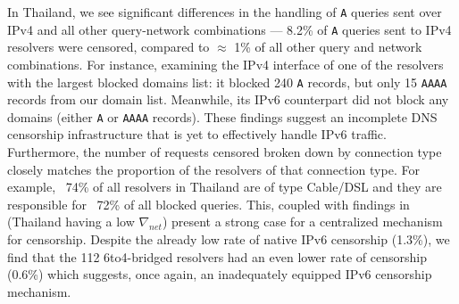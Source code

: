 In Thailand, we see significant differences in the handling of {\tt A} queries
sent over IPv4 and all other query-network combinations --- 8.2\% of \texttt{A}
queries sent to IPv4 resolvers were censored, compared to $\approx$ 1\% of all
other query and network combinations. 
For instance, examining the IPv4 interface of one of the resolvers with the
largest blocked domains list: it blocked 240 \texttt{A} records, but only 15
\texttt{AAAA} records from our domain list. Meanwhile, its IPv6 counterpart did
not block any domains (either \texttt{A} or \texttt{AAAA} records). These
findings suggest an incomplete DNS censorship infrastructure that is yet to
effectively handle IPv6 traffic.
%
Furthermore, the number of requests censored broken down by connection type
closely matches the proportion of the resolvers of that connection type. For
example, ~74\% of all resolvers in Thailand are of type Cable/DSL and they are
responsible for ~72\% of all blocked queries. This, coupled with findings in
 (Thailand having a low $\nabla_{net}$)
present a strong case for a centralized mechanism for censorship. 
%
Despite the already low rate of native IPv6 censorship (1.3\%), we find that
the 112 6to4-bridged resolvers had an even lower rate of censorship (0.6\%)
which suggests, once again, an inadequately equipped IPv6 censorship mechanism.






